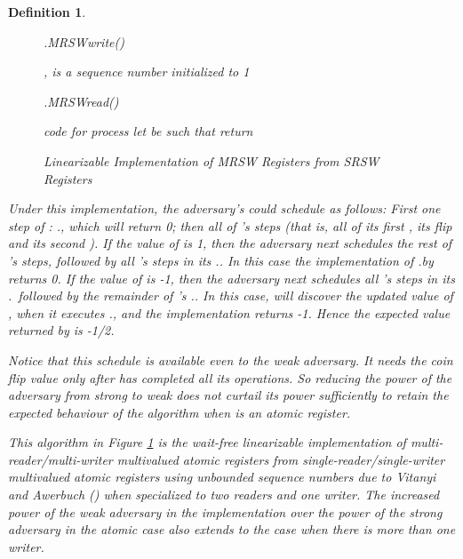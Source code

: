 \documentclass[11pt,letterpaper]{article}
\def\read{\text{\tt read}\xspace}
\newtheorem{definition}[theorem]{Definition}
\begin{document}
\begin{definition}
\begin{figure}
 \begin{minipage}[t]{.4\textwidth}
 \begin{function}[H]
   \caption{.MRSWwrite()}
    ,  is a sequence number initialized to 1\;
     \;
    

 \end{function}
 \end{minipage}\hfill
 \begin{minipage}[t]{.55\textwidth}
 \begin{function}[H]
   \caption{.MRSWread()}
    code for process  \;
    \;
    \;
    \;
   let  be such that  \;
    \;
    \;
   return 
 \end{function}
 \end{minipage}\caption{Linearizable Implementation of MRSW Registers from SRSW Registers}\label{fig:multireader_registers}
\end{figure}

Under this implementation, the adversary's could schedule as follows:
First one step of : .\read, which will return 0;
then all of 's steps (that is,  all of its first \MRwrite, its flip and its second \MRwrite).
If the value of  is 1,
then the adversary next schedules the rest of 's steps,
followed by all 's steps in its .\MRread.
In this case the implementation of .\MRread by  returns 0.
If the value of  is -1,
then the adversary next schedules all 's steps in its .\MRread\
followed by the remainder of 's .\MRread.
In this case,  will discover the updated value of , when it
executes .\read, and the implementation returns -1.
Hence the expected value returned by  is -1/2.

Notice that this schedule is available even to the weak adversary.
It needs the coin flip value only after  has completed all its operations.
So reducing the power of the adversary from strong to weak
does not curtail its power sufficiently to retain the expected behaviour of the algorithm
when  is an atomic register.

This algorithm in Figure  \ref{fig:multireader_registers} is
the wait-free linearizable implementation
of multi-reader/multi-writer multivalued atomic registers from
single-reader/single-writer multivalued atomic registers
using unbounded sequence numbers
due to Vitanyi and Awerbuch (\cite{vit:atom})
when specialized to two readers and one writer.
The increased power of the weak adversary in the implementation over the power
of the strong adversary in the atomic case also extends to the case when there is more than one writer.




\end{definition}
\end{document}
